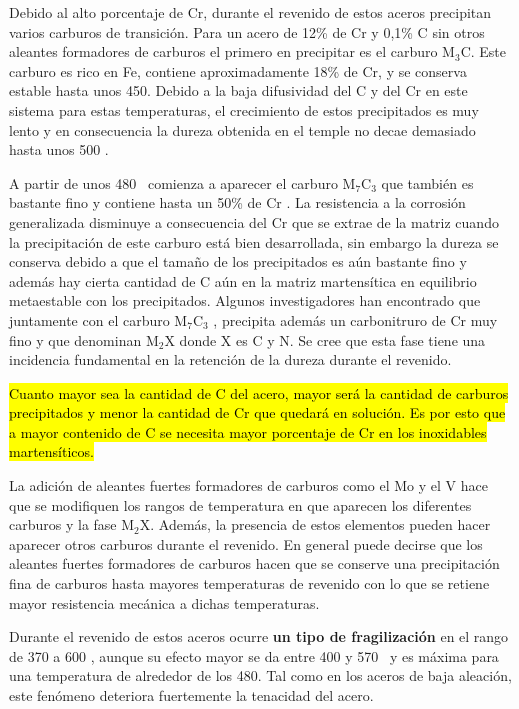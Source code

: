 Debido al alto porcentaje de Cr, durante el revenido de estos aceros precipitan varios carburos de transición. Para un acero de 12\% de Cr y 0,1\% C sin otros aleantes formadores de carburos el primero en precipitar es el carburo M$_3$C. Este carburo es rico en Fe, contiene aproximadamente 18\% de Cr, y se conserva estable hasta unos 450\grad. Debido a la baja difusividad del C y del Cr en este sistema para estas temperaturas, el crecimiento de estos precipitados es muy lento y en consecuencia la dureza obtenida en el temple no decae demasiado hasta unos 500 \grad.


A partir de unos 480\grad~ comienza a aparecer el carburo M$_7$C$_3$ que también es bastante fino y contiene hasta un 50\% de Cr . La resistencia a la corrosión generalizada disminuye a consecuencia del Cr que se extrae de la matriz cuando la precipitación de este carburo está bien desarrollada, sin embargo la dureza se conserva debido a que el tamaño de los precipitados es aún bastante fino y además hay cierta cantidad de C aún en la matriz martensítica en equilibrio metaestable con los precipitados. Algunos investigadores han encontrado que juntamente con el carburo M$_7$C$_3$ , precipita además un carbonitruro de Cr muy fino y que denominan M$_2$X donde X es C y N. Se cree que esta fase tiene una incidencia fundamental en la retención de la dureza durante el revenido.

\hl{Cuanto mayor sea la cantidad de C del acero, mayor será la cantidad de carburos precipitados y menor la cantidad de Cr que quedará en solución. Es por esto que a mayor contenido de C se necesita mayor porcentaje de Cr en los inoxidables martensíticos.}

La adición de aleantes fuertes formadores de carburos como el Mo y el V hace que se modifiquen los rangos de temperatura en que aparecen los diferentes carburos y la fase M$_2$X. Además, la presencia de estos elementos pueden hacer aparecer otros carburos durante el revenido. En general puede decirse que los aleantes fuertes formadores de carburos hacen que se conserve una precipitación fina de carburos hasta mayores temperaturas de revenido con lo que se retiene mayor resistencia mecánica a dichas temperaturas.


Durante el revenido de estos aceros ocurre \textbf{un tipo de fragilización} en el rango de 370 a 600 \grad, aunque su efecto mayor se da entre 400 y 570\grad~ y es máxima para una temperatura de alrededor de los 480\grad. Tal como en los aceros de baja aleación, este fenómeno deteriora fuertemente la tenacidad del acero. 

